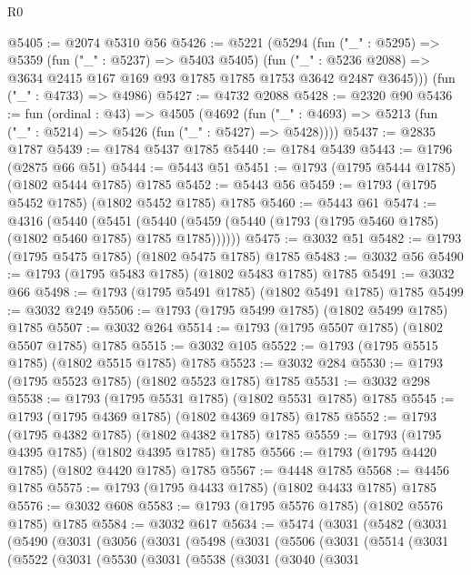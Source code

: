 \begin{lexlean}{R0}
\begin{coremodule}
@5405 := @2074 @5310 @56
@5426 := @5221
    (@5294
      (fun ("_" : @5295) =>
      @5359
        (fun ("_" : @5237) => @5403 @5405)
        (fun ("_" : @5236 @2088) => @3634 @2415 @167 @169 @93 @1785 @1785 @1753 @3642 @2487 @3645)))
    (fun ("_" : @4733) => @4986)
@5427 := @4732 @2088
@5428 := @2320 @90
@5436 := fun (ordinal : @43) =>
  @4505
    (@4692 (fun ("_" : @4693) => @5213 (fun ("_" : @5214) => @5426 (fun ("_" : @5427) => @5428))))
@5437 := @2835 @1787
@5439 := @1784 @5437 @1785
@5440 := @1784 @5439
@5443 := @1796 (@2875 @66 @51)
@5444 := @5443 @51
@5451 := @1793 (@1795 @5444 @1785) (@1802 @5444 @1785) @1785
@5452 := @5443 @56
@5459 := @1793 (@1795 @5452 @1785) (@1802 @5452 @1785) @1785
@5460 := @5443 @61
@5474 := @4316
    (@5440
      (@5451 (@5440 (@5459 (@5440 (@1793 (@1795 @5460 @1785) (@1802 @5460 @1785) @1785 @1785))))))
@5475 := @3032 @51
@5482 := @1793 (@1795 @5475 @1785) (@1802 @5475 @1785) @1785
@5483 := @3032 @56
@5490 := @1793 (@1795 @5483 @1785) (@1802 @5483 @1785) @1785
@5491 := @3032 @66
@5498 := @1793 (@1795 @5491 @1785) (@1802 @5491 @1785) @1785
@5499 := @3032 @249
@5506 := @1793 (@1795 @5499 @1785) (@1802 @5499 @1785) @1785
@5507 := @3032 @264
@5514 := @1793 (@1795 @5507 @1785) (@1802 @5507 @1785) @1785
@5515 := @3032 @105
@5522 := @1793 (@1795 @5515 @1785) (@1802 @5515 @1785) @1785
@5523 := @3032 @284
@5530 := @1793 (@1795 @5523 @1785) (@1802 @5523 @1785) @1785
@5531 := @3032 @298
@5538 := @1793 (@1795 @5531 @1785) (@1802 @5531 @1785) @1785
@5545 := @1793 (@1795 @4369 @1785) (@1802 @4369 @1785) @1785
@5552 := @1793 (@1795 @4382 @1785) (@1802 @4382 @1785) @1785
@5559 := @1793 (@1795 @4395 @1785) (@1802 @4395 @1785) @1785
@5566 := @1793 (@1795 @4420 @1785) (@1802 @4420 @1785) @1785
@5567 := @4448 @1785
@5568 := @4456 @1785
@5575 := @1793 (@1795 @4433 @1785) (@1802 @4433 @1785) @1785
@5576 := @3032 @608
@5583 := @1793 (@1795 @5576 @1785) (@1802 @5576 @1785) @1785
@5584 := @3032 @617
@5634 := @5474
    (@3031
      (@5482
        (@3031
          (@5490
            (@3031
              (@3056
                (@3031
                  (@5498
                    (@3031
                      (@5506
                        (@3031
                          (@5514
                            (@3031
                              (@5522
                                (@3031
                                  (@5530
                                    (@3031
                                      (@5538
                                        (@3031
                                          (@3040
                                            (@3031

\end{coremodule}
\end{lexlean}

